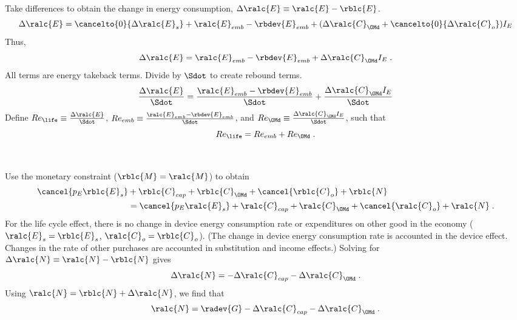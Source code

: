 \begin{landscape}
{Take differences to obtain the change in energy consumption, $\Delta \ralc{E} \equiv \ralc{E} - \rblc{E}$.
%
\begin{equation}
  \Delta \ralc{E} = \cancelto{0}{\Delta \ralc{E}_s}
                    + \ralc{E}_{emb} - \rbdev{E}_{emb}
                    + (\Delta \ralc{C}_{\OMd} + \cancelto{0}{\Delta \ralc{C}_o}) I_E
\end{equation}
%
Thus, 
%
\begin{equation}
  \Delta \ralc{E} = \ralc{E}_{emb} - \rbdev{E}_{emb} + \Delta \ralc{C}_{\OMd} I_E \; .
\end{equation}
%
All terms are energy takeback terms.
Divide by $\Sdot$
to create rebound terms.
%
\begin{equation}
  \frac{\Delta \ralc{E}}{\Sdot} = \frac{\ralc{E}_{emb} - \rbdev{E}_{emb}}{\Sdot} + \frac{\Delta \ralc{C}_{\OMd} I_E}{\Sdot}
\end{equation}
%
Define
$Re_{\life} \equiv \frac{\Delta \ralc{E}}{\Sdot}$, 
$Re_{emb} \equiv \frac{\ralc{E}_{emb} - \rbdev{E}_{emb}}{\Sdot}$, and
$Re_{\OMd} \equiv \frac{\Delta \ralc{C}_{\OMd} I_E}{\Sdot}$,
such that
%
\begin{equation} \label{eq:Re_lc_def}
  Re_{\life} = Re_{emb} + Re_{\OMd} \; .
\end{equation}
%
}
{
~

Use the monetary constraint ($\rblc{M} = \ralc{M}$) to obtain
%
\begin{align} \label{M_dot_bal_lc}
  \cancel{p_E \rblc{E}_s} &+ \rblc{C}_{cap} + \rblc{C}_{\OMd} + \cancel{\rblc{C}_o} + \rblc{N} \nonumber \\
                          &= \cancel{p_E \ralc{E}_s} + \ralc{C}_{cap} + \ralc{C}_{\OMd} + \cancel{\ralc{C}_o}  + \ralc{N} \; .
\end{align}
%
For the life cycle effect, 
there is no change in device energy consumption rate or expenditures on other good in the economy 
($\ralc{E}_s = \rblc{E}_s$, $\ralc{C}_o = \rblc{C}_o$).
(The change in device energy consumption rate is accounted in the device effect.
Changes in the rate of other purchases are accounted in substitution and income effects.)
Solving for $\Delta \ralc{N} \equiv \ralc{N} - \rblc{N}$ gives
%
\begin{equation}
  \Delta \ralc{N} = - \Delta \ralc{C}_{cap} - \Delta \ralc{C}_{\OMd} \; .
\end{equation}
%
Using $\ralc{N} = \rblc{N} + \Delta \ralc{N}$, we find that
%
\begin{equation}
  \ralc{N} = \radev{G} - \Delta \ralc{C}_{cap} - \Delta \ralc{C}_{\OMd} \; .
\end{equation}
%
}

\end{landscape}
